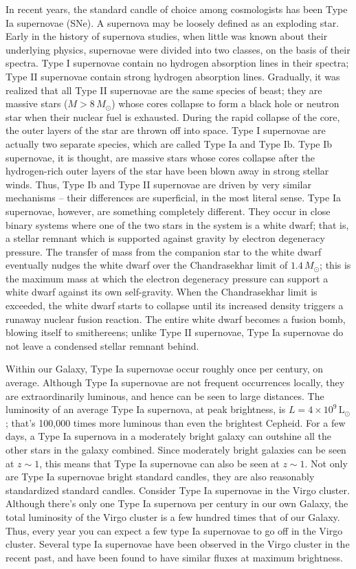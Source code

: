 \documentclass[a4paper,11pt]{article}
\begin{document}
{\noindent}In recent years, the standard candle of choice among cosmologists has been Type Ia supernovae (SNe). A supernova may be loosely defined as an exploding star. Early in the history of supernova studies, when little was known about their underlying physics, supernovae were divided into two classes, on the basis of their spectra. Type I supernovae contain no hydrogen absorption lines in their spectra; Type II supernovae contain strong hydrogen absorption lines. Gradually, it was realized that all Type II supernovae are the same species of beast; they are massive stars ($M>8\,M_\odot$) whose cores collapse to form a black hole or neutron star when their nuclear fuel is exhausted. During the rapid collapse of the core, the outer layers of the star are thrown off into space. Type I supernovae are actually two separate species, which are called Type Ia and Type Ib. Type Ib supernovae, it is thought, are massive stars whose cores collapse after the hydrogen-rich outer layers of the star have been blown away in strong stellar winds. Thus, Type Ib and Type II supernovae are driven by very similar mechanisms -- their differences are superficial, in the most literal sense. Type Ia supernovae, however, are something completely different. They occur in close binary systems where one of the two stars in the system is a white dwarf; that is, a stellar remnant which is supported against gravity by electron degeneracy pressure. The transfer of mass from the companion star to the white dwarf eventually nudges the white dwarf over the Chandrasekhar limit of $1.4\,M_\odot$; this is the maximum mass at which the electron degeneracy pressure can support a white dwarf against its own self-gravity. When the Chandrasekhar limit is exceeded, the white dwarf starts to collapse until its increased density triggers a runaway nuclear fusion reaction. The entire white dwarf becomes a fusion bomb, blowing itself to smithereens; unlike Type II supernovae, Type Ia supernovae do not leave a condensed stellar remnant behind.

{\noindent}Within our Galaxy, Type Ia supernovae occur roughly once per century, on average. Although Type Ia supernovae are not frequent occurrences locally, they are extraordinarily luminous, and hence can be seen to large distances. The luminosity of an average Type Ia supernova, at peak brightness, is $L=4\times10^9\,\mathrm{L}_\odot$; that’s 100,000 times more luminous than even the brightest Cepheid. For a few days, a Type Ia supernova in a moderately bright galaxy can outshine all the other stars in the galaxy combined. Since moderately bright galaxies can be seen at $z\sim1$, this means that Type Ia supernovae can also be seen at $z\sim1$. Not only are Type Ia supernovae bright standard candles, they are also reasonably standardized standard candles. Consider Type Ia supernovae in the Virgo cluster. Although there’s only one Type Ia supernova per century in our own Galaxy, the total luminosity of the Virgo cluster is a few hundred times that of our Galaxy. Thus, every year you can expect a few type Ia supernovae to go off in the Virgo cluster. Several type Ia supernovae have been observed in the Virgo cluster in the recent past, and have been found to have similar fluxes at maximum brightness.
\end{document}
